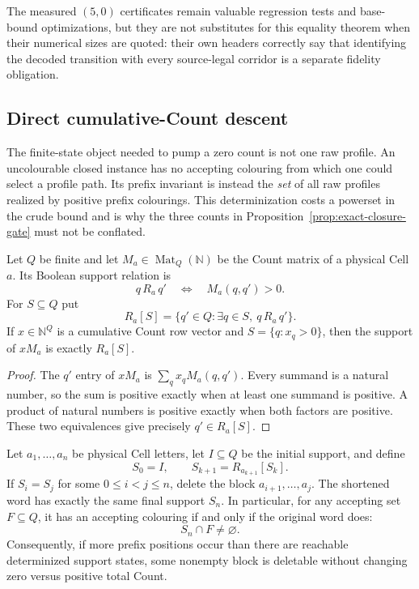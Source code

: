The measured $(5,0)$ certificates remain valuable regression tests and
base-bound optimizations, but they are not substitutes for this equality
theorem when their numerical sizes are quoted: their own headers correctly
say that identifying the decoded transition with every source-legal corridor
is a separate fidelity obligation.

\subsection{Direct cumulative-Count descent}

The finite-state object needed to pump a zero count is not one raw profile.
An uncolourable closed instance has no accepting colouring from which one
could select a profile path.  Its prefix invariant is instead the \emph{set}
of all raw profiles realized by positive prefix colourings.  This
determinization costs a powerset in the crude bound and is why the three
counts in Proposition~\ref{prop:exact-closure-gate} must not be conflated.

\begin{definition}
\label{def:count-support-action}
\Sprose
Let $Q$ be finite and let $M_a\in\operatorname{Mat}_Q(\mathbb N)$ be the
Count matrix of a physical Cell $a$.  Its Boolean support relation is
\[
       q\,R_a\,q' \quad\Longleftrightarrow\quad M_a(q,q')>0.
\]
For $S\subseteq Q$ put
\[
       R_a[S]=\{q'\in Q:\exists q\in S,\ q\,R_a\,q'\}.
\]
If $x\in\mathbb N^Q$ is a cumulative Count row vector and
$S=\{q:x_q>0\}$, then the support of $xM_a$ is exactly $R_a[S]$.
\end{definition}

\begin{proof}
The $q'$ entry of $xM_a$ is
$\sum_q x_qM_a(q,q')$.  Every summand is a natural number, so the sum is
positive exactly when at least one summand is positive.  A product of natural
numbers is positive exactly when both factors are positive.  These two
equivalences give precisely $q'\in R_a[S]$.
\end{proof}

\begin{theorem}
\label{thm:determinized-support-deletion}
\Sprose
Let $a_1,\ldots,a_n$ be physical Cell letters, let $I\subseteq Q$ be the
initial support, and define
\[
  S_0=I,\qquad S_{k+1}=R_{a_{k+1}}[S_k].
\]
If $S_i=S_j$ for some $0\le i<j\le n$, delete the block
$a_{i+1},\ldots,a_j$.  The shortened word has exactly the same final support
$S_n$.  In particular, for any accepting set $F\subseteq Q$, it has an
accepting colouring if and only if the original word does:
\[
                         S_n\cap F\ne\varnothing .
\]
Consequently, if more prefix positions occur than there are reachable
determinized support states, some nonempty block is deletable without
changing zero versus positive total Count.
\end{theorem}


